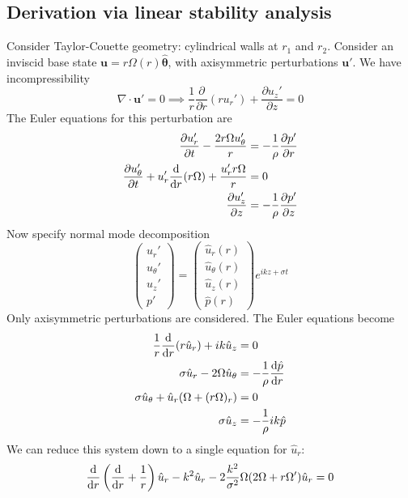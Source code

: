\documentclass{jknotes}
\renewcommand{\u}{\symbf{u}}
\begin{document}
\subsection{Derivation via linear stability analysis}
Consider Taylor-Couette geometry: cylindrical walls at $r_1$ and $r_2$.
Consider an inviscid base state $\u = r \Omega(r) \hat{\symbf{\theta}}$, with
axisymmetric perturbations $\u'$. We have incompressibility
\begin{equation}
	\nabla \cdot \u' = 0 \implies \frac{1}{r}\frac{\partial}{\partial
	r}(ru_r') + \frac{\partial u_z'}{\partial z} = 0
\end{equation}
The Euler equations for this perturbation are
\begin{align}
	\frac{\partial u_r'}{\partial t} - \frac{2r \Omega u_\theta'}{r} &=
	-\frac{1}{\rho} \frac{\partial p'}{\partial r} \\
	\frac{\partial u_\theta'}{\partial t} + u_r'\frac{\diffd}{\diffd
r}(r\Omega) + \frac{u_r' r \Omega}{r} &= 0 \\
\frac{\partial u_z'}{\partial z} &= -\frac{1}{\rho}\frac{\partial p'}{\partial
z}
\end{align}
Now specify normal mode decomposition
\begin{equation}
	\begin{pmatrix} u_r' \\ u_\theta' \\ u_z' \\ p' \end{pmatrix} = 
	\begin{pmatrix} \hat{u}_r(r) \\ \hat{u}_\theta(r) \\ \hat{u}_z(r) \\
	\hat{p}(r) \end{pmatrix} e^{ikz + \sigma t}
\end{equation}
Only axisymmetric perturbations are considered. The Euler equations become
\begin{align}
	\frac{1}{r}\frac{\diffd}{\diffd r}(r\hat{u}_r) + ik \hat{u}_z &= 0 \\
	\sigma \hat{u}_r - 2\Omega \hat{u}_\theta &= - \frac{1}{\rho} \frac{\diffd
	\hat{p}}{\diffd r} \\
		\sigma \hat{u}_\theta + \hat{u}_r(\Omega + (r\Omega)_r) &= 0 \\
		\sigma \hat{u}_z &= -\frac{1}{\rho} ik \hat{p}
\end{align}
We can reduce this system down to a single equation for $\hat{u}_r$:
\begin{equation}
	\frac{\diffd}{\diffd r}\left(\frac{\diffd}{\diffd r} +
	\frac{1}{r}\right)\hat{u}_r - k^2 \hat{u}_r -2\frac{k^2}{\sigma^2}
	\Omega(2\Omega + r\Omega')\hat{u}_r = 0
\end{equation}
\end{document}

